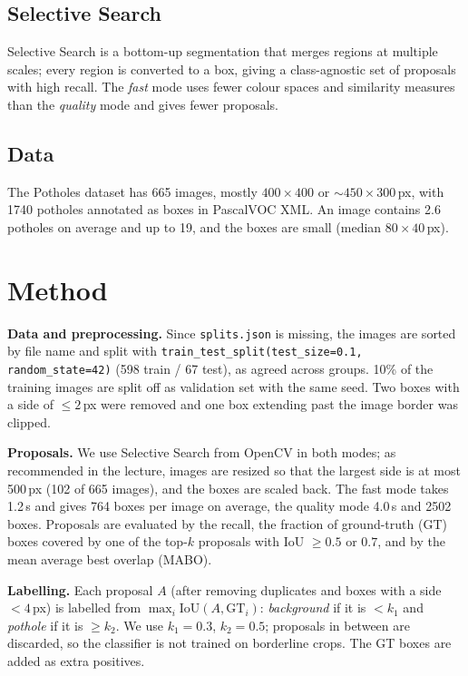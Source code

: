\documentclass[10pt,twocolumn,letterpaper]{article}
\begin{document}
\subsection{Selective Search}
Selective Search is a bottom-up segmentation that merges regions at multiple scales; every region is converted to a box, giving a class-agnostic set of proposals with high recall. The \emph{fast} mode uses fewer colour spaces and similarity measures than the \emph{quality} mode and gives fewer proposals.

\subsection{Data}
The Potholes dataset has 665 images, mostly $400\times400$ or ${\sim}450\times300$\,px, with 1740 potholes annotated as boxes in PascalVOC XML. An image contains 2.6 potholes on average and up to 19, and the boxes are small (median $80\times40$\,px).

\section{Method}
\noindent\textbf{Data and preprocessing.}
Since \texttt{splits.json} is missing, the images are sorted by file name and split with \texttt{train\_test\_split(test\_size=0.1, random\_state=42)} (598 train / 67 test), as agreed across groups. 10\% of the training images are split off as validation set with the same seed. Two boxes with a side of $\le 2$\,px were removed and one box extending past the image border was clipped.

\noindent\textbf{Proposals.}
We use Selective Search from OpenCV in both modes; as recommended in the lecture, images are resized so that the largest side is at most 500\,px (102 of 665 images), and the boxes are scaled back. The fast mode takes 1.2\,s and gives 764 boxes per image on average, the quality mode 4.0\,s and 2502 boxes. Proposals are evaluated by the recall, \ie the fraction of ground-truth (GT) boxes covered by one of the top-$k$ proposals with IoU $\ge 0.5$ or $0.7$, and by the mean average best overlap (MABO).

\noindent\textbf{Labelling.}
Each proposal $A$ (after removing duplicates and boxes with a side $<4$\,px) is labelled from $\max_i \text{IoU}(A,\text{GT}_i)$: \emph{background} if it is $<k_1$ and \emph{pothole} if it is $\ge k_2$. We use $k_1=0.3$, $k_2=0.5$; proposals in between are discarded, so the classifier is not trained on borderline crops. The GT boxes are added as extra positives.
\end{document}

